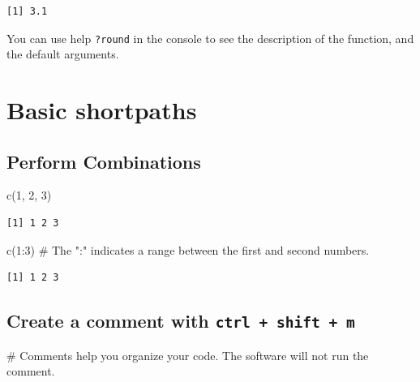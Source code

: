 \documentclass[
  letterpaper,
  DIV=11,
  numbers=noendperiod]{scrreprt}
\newenvironment{Shaded}{\begin{snugshade}}{\end{snugshade}}
\newcommand{\CommentTok}[1]{\textcolor[rgb]{0.37,0.37,0.37}{#1}}
\newcommand{\DecValTok}[1]{\textcolor[rgb]{0.68,0.00,0.00}{#1}}
\newcommand{\FunctionTok}[1]{\textcolor[rgb]{0.28,0.35,0.67}{#1}}
\newcommand{\NormalTok}[1]{\textcolor[rgb]{0.00,0.23,0.31}{#1}}
\newcommand{\SpecialCharTok}[1]{\textcolor[rgb]{0.37,0.37,0.37}{#1}}
\begin{document}
\begin{verbatim}
[1] 3.1
\end{verbatim}

You can use help \texttt{?round} in the console to see the description
of the function, and the default arguments.

\section{Basic shortpaths}\label{basic-shortpaths}

\subsection{Perform Combinations}\label{perform-combinations}

\begin{Shaded}
\begin{Highlighting}[]
\FunctionTok{c}\NormalTok{(}\DecValTok{1}\NormalTok{, }\DecValTok{2}\NormalTok{, }\DecValTok{3}\NormalTok{)}
\end{Highlighting}
\end{Shaded}

\begin{verbatim}
[1] 1 2 3
\end{verbatim}

\begin{Shaded}
\begin{Highlighting}[]
\FunctionTok{c}\NormalTok{(}\DecValTok{1}\SpecialCharTok{:}\DecValTok{3}\NormalTok{) }\CommentTok{\# The ":" indicates a range between the first and second numbers. }
\end{Highlighting}
\end{Shaded}

\begin{verbatim}
[1] 1 2 3
\end{verbatim}

\subsection{\texorpdfstring{Create a comment with
\texttt{ctrl\ +\ shift\ +\ m}}{Create a comment with ctrl + shift + m}}\label{create-a-comment-with-ctrl-shift-m}

\begin{Shaded}
\begin{Highlighting}[]
\CommentTok{\# Comments help you organize your code. The software will not run the comment. }
\end{Highlighting}
\end{Shaded}
\end{document}
